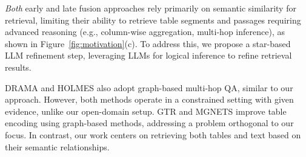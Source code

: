 \emph{Both} early and late fusion approaches rely primarily on semantic similarity for retrieval, limiting their ability to retrieve table segments and passages requiring advanced reasoning (e.g., column-wise aggregation, multi-hop inference), as shown in Figure~\ref{fig:motivation}(c).
To address this, we propose a star-based LLM refinement step, leveraging LLMs for logical inference to refine retrieval results.

{\feditcolor
DRAMA \citep{DRAMA} and HOLMES \citep{HOLMES} also adopt graph-based multi-hop QA, similar to our approach. 
However, both methods operate in a constrained setting with given evidence, unlike our open-domain setup.
GTR \citep{GTR} and MGNETS \citep{MGNETS} improve table encoding using graph-based methods, addressing a problem orthogonal to our focus. 
In contrast, our work centers on retrieving both tables and text based on their semantic relationships.
}